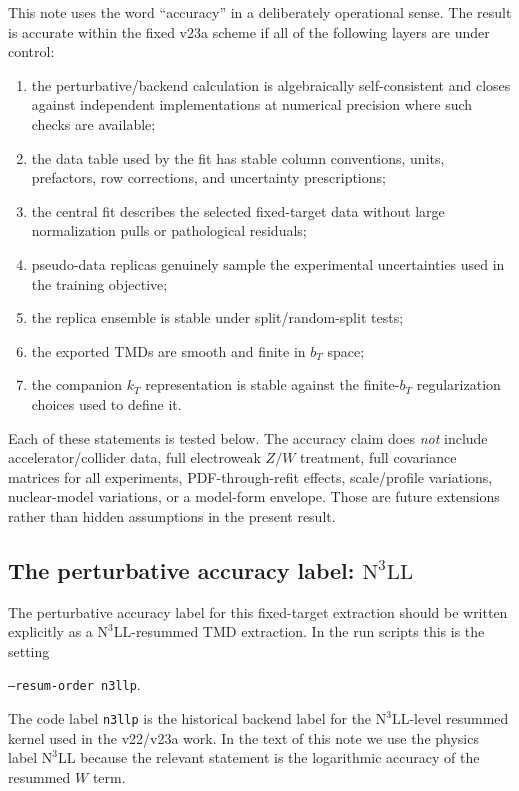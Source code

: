 \documentclass[11pt]{article}
\newcommand{\bt}{b_T}
\newcommand{\kt}{k_T}
\newcommand{\NthreeLL}{\mathrm{N^{3}LL}}
\newcommand{\code}[1]{\texttt{#1}}
\begin{document}
This note uses the word ``accuracy'' in a deliberately operational sense.  The result is accurate within the fixed v23a scheme if all of the following layers are under control:
\begin{enumerate}[leftmargin=2em]
  \item the perturbative/backend calculation is algebraically self-consistent and closes against independent implementations at numerical precision where such checks are available;
  \item the data table used by the fit has stable column conventions, units, prefactors, row corrections, and uncertainty prescriptions;
  \item the central fit describes the selected fixed-target data without large normalization pulls or pathological residuals;
  \item pseudo-data replicas genuinely sample the experimental uncertainties used in the training objective;
  \item the replica ensemble is stable under split/random-split tests;
  \item the exported TMDs are smooth and finite in $\bt$ space;
  \item the companion $\kt$ representation is stable against the finite-$\bt$ regularization choices used to define it.
\end{enumerate}
Each of these statements is tested below.  The accuracy claim does \emph{not} include accelerator/collider data, full electroweak $Z/W$ treatment, full covariance matrices for all experiments, PDF-through-refit effects, scale/profile variations, nuclear-model variations, or a model-form envelope.  Those are future extensions rather than hidden assumptions in the present result.


\subsection{The perturbative accuracy label: \texorpdfstring{$\NthreeLL$}{N3LL}}
\label{sec:n3ll-label}

The perturbative accuracy label for this fixed-target extraction should be written explicitly as a $\NthreeLL$-resummed TMD extraction.  In the run scripts this is the setting
\begin{center}
\code{--resum-order n3llp}.
\end{center}
The code label \code{n3llp} is the historical backend label for the $\NthreeLL$-level resummed kernel used in the v22/v23a work.  In the text of this note we use the physics label $\NthreeLL$ because the relevant statement is the logarithmic accuracy of the resummed $W$ term.
\end{document}
